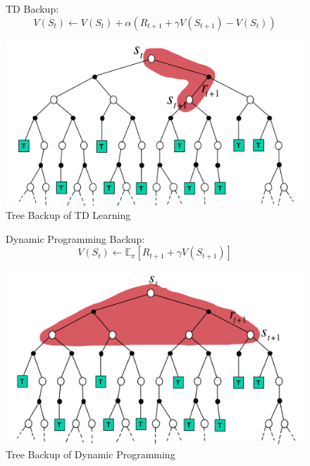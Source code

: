 \begin{figure}[H]
    \begin{minipage}{0.5\textwidth}
        TD Backup:
      \[
        V(S_t) \leftarrow V(S_t) + \alpha\left( 
            R_{t+1} + \gamma V(S_{t+1}) - V(S_t)
         \right)
      \]
    \end{minipage}%
    \begin{minipage}{0.5\textwidth}
      \includegraphics[width=\textwidth]{figures/uni-td.png}
      \caption{Tree Backup of TD Learning}
        \label{fig:uni-td}
    \end{minipage}
\end{figure}
\begin{figure}[H]
    \begin{minipage}{0.5\textwidth}
        Dynamic Programming Backup:
      \[
        V(S_t) \leftarrow \mathbb{E}_\pi \left[ 
            R_{t+1} + \gamma V(S_{t+1})
         \right]
      \]
    \end{minipage}%
    \begin{minipage}{0.5\textwidth}
      \includegraphics[width=\textwidth]{figures/uni-dp.png}
      \caption{Tree Backup of Dynamic Programming}
        \label{fig:uni-dp}
    \end{minipage}
\end{figure}

